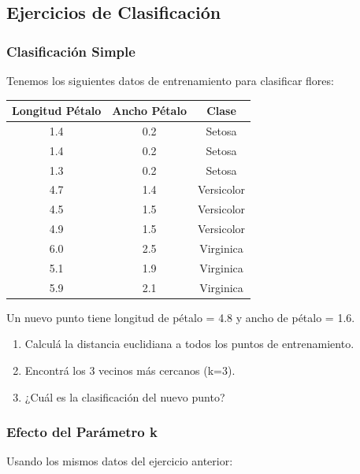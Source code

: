 \documentclass[12pt]{article}
\begin{document}
\subsection{Ejercicios de Clasificación}

\subsubsection{Clasificación Simple}

Tenemos los siguientes datos de entrenamiento para clasificar flores:

\begin{table}[H]
    \centering
    \begin{tabular}{ccc}
        \toprule
        \textbf{Longitud Pétalo} & \textbf{Ancho Pétalo} & \textbf{Clase} \\
        \midrule
        1.4 & 0.2 & Setosa \\
        1.4 & 0.2 & Setosa \\
        1.3 & 0.2 & Setosa \\
        4.7 & 1.4 & Versicolor \\
        4.5 & 1.5 & Versicolor \\
        4.9 & 1.5 & Versicolor \\
        6.0 & 2.5 & Virginica \\
        5.1 & 1.9 & Virginica \\
        5.9 & 2.1 & Virginica \\
        \bottomrule
    \end{tabular}
\end{table}

Un nuevo punto tiene longitud de pétalo = 4.8 y ancho de pétalo = 1.6.

\begin{enumerate}
    \item Calculá la distancia euclidiana a todos los puntos de entrenamiento.
    \item Encontrá los 3 vecinos más cercanos (k=3).
    \item ¿Cuál es la clasificación del nuevo punto?
\end{enumerate}

\subsubsection{Efecto del Parámetro k}

Usando los mismos datos del ejercicio anterior:
\end{document}

